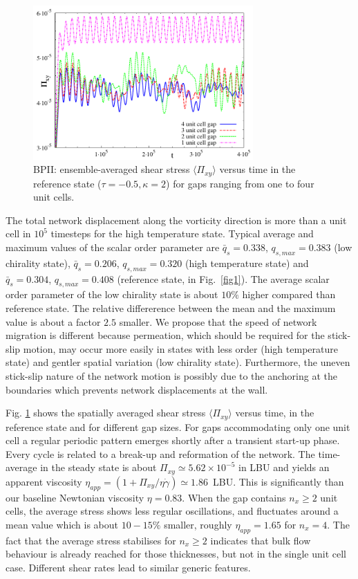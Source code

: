 \documentclass[12pt,twoside]{iopart}
\newcommand{\ex}[1]{\times10^{#1}}
\begin{document}
\begin{figure}[t]
\centering
\includegraphics[width=0.75\textwidth]{stress_bp2_fbc.pdf}
\caption{BPII: ensemble-averaged shear stress $\langle \Pi_{xy}\rangle$
versus time in the reference state ($\tau=-0.5, \kappa=2$) for gaps ranging
from one to four unit cells.}
\label{fig3}
\end{figure}

The total network displacement along the vorticity direction is more than
a unit cell in $10^5$ timesteps for the high temperature state.
Typical average and maximum values of the scalar order parameter are
$\bar{q}_s=0.338$, $q_{s,max}=0.383$ (low chirality state), 
$\bar{q}_s=0.206$, $q_{s,max}=0.320$ (high temperature state) and
$\bar{q}_s=0.304$, $q_{s,max}=0.408$ (reference state, in Fig.~\ref{fig1}).
The average scalar order parameter of the low chirality state is about
$10\%$ higher compared than reference state. The  relative differerence
between the mean and the maximum value is about a factor $2.5$ smaller.
We propose that the speed of network migration is different because
permeation, which should be required for the stick-slip motion, may occur
more easily in states with less order (high temperature state) and gentler
spatial variation (low chirality state). Furthermore, the uneven stick-slip
nature of the network motion is possibly due to the anchoring at the
boundaries which prevents network displacements at the wall. 

Fig. \ref{fig3} shows the spatially averaged shear stress $\langle \Pi_{xy}\rangle$ versus time, in the reference state and for different gap sizes.
For gaps accommodating only one unit cell a regular periodic pattern emerges shortly after a transient start-up phase.
Every cycle is related to a break-up and reformation of the network.
The time-average in the steady state is about $\Pi_{xy}\simeq5.62\ex{-5}$
in LBU and yields an apparent viscosity
$\eta_{app}=(1 +\Pi_{xy}/\eta\dot{\gamma})\simeq 1.86$~LBU. This is
significantly than our baseline Newtonian viscosity $\eta = 0.83$.
When the gap contains $n_x\ge2$ unit cells, the average stress shows
less regular oscillations, and fluctuates around a mean value which is
about $10-15\%$ smaller, roughly $\eta_{app}=1.65$ for $n_x=4$. The fact
that the average stress stabilises for $n_x\ge2$ indicates that bulk flow
behaviour is already reached for those thicknesses, but not in the single
unit cell case. Different shear rates lead to similar generic features.
\end{document}
